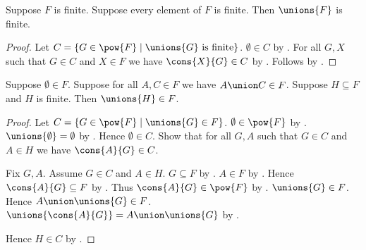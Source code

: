 \begin{proposition}\label{unions_of_finite_family_is_finite}
    Suppose $F$ is finite.
    Suppose every element of $F$ is finite.
    Then $\unions{F}$ is finite.
\end{proposition}
\begin{proof}
    Let $C=\{G\in\pow{F}\mid \text{$\unions{G}$ is finite}\}$.
    $\emptyset\in C$ by .
    For all $G,X$ such that $G\in C$ and $X\in F$ we have
        $\cons{X}{G}\in C$
        by .
    Follows by .
\end{proof}

\begin{theorem}\label{finite_family_union_in_binary_union_closed_family}
    Suppose $\emptyset\in F$.
    Suppose for all $A,C\in F$ we have $A\union C\in F$.
    Suppose $H\subseteq F$ and $H$ is finite.
    Then $\unions{H}\in F$.
\end{theorem}
\begin{proof}
    Let $C=\{G\in\pow{F}\mid \unions{G}\in F\}$.
    $\emptyset\in\pow{F}$ by .
    $\unions{\emptyset}=\emptyset$ by .
    Hence $\emptyset\in C$.
    Show that for all $G,A$ such that $G\in C$ and $A\in H$ we have
        $\cons{A}{G}\in C$.
    \begin{subproof}
        Fix $G,A$.
        Assume $G\in C$ and $A\in H$.
        $G\subseteq F$ by .
        $A\in F$ by .
        Hence $\cons{A}{G}\subseteq F$ by
            .
        Thus $\cons{A}{G}\in\pow{F}$ by
            .
        $\unions{G}\in F$.
        Hence $A\union\unions{G}\in F$.
        $\unions{\cons{A}{G}}=A\union\unions{G}$ by
            .
    \end{subproof}
    Hence $H\in C$ by .
\end{proof}

